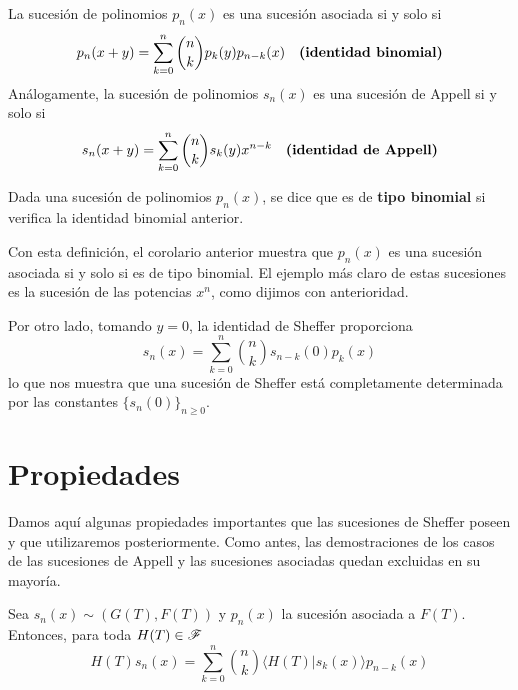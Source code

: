 \begin{corolario}\label{identidad binomial y de Appell}
    La sucesión de polinomios $p_n(x)$ es una sucesión asociada si y solo si
    \begin{equation*}
        p_n (x+y) = \sum_{k=0}^n \binom{n}{k} p_k (y) p_{n-k}(x) \quad \textnormal{\textbf{(identidad binomial)}}
    \end{equation*}
    Análogamente, la sucesión de polinomios $s_n(x)$ es una sucesión de Appell si y solo si
    \begin{equation*}
        s_n (x+y) = \sum_{k=0}^n \binom{n}{k} s_k (y)x^{n-k} \quad \textnormal{\textbf{(identidad de Appell)}}
    \end{equation*}
\end{corolario}

\begin{definicion}
    Dada una sucesión de polinomios $p_n(x)$, se dice que es de \textbf{tipo binomial} si verifica la identidad binomial anterior.
\end{definicion}

\begin{obs}
    Con esta definición, el corolario anterior muestra que $p_n(x)$ es una sucesión asociada si y solo si es de tipo binomial. El ejemplo más claro de estas sucesiones es la sucesión de las potencias $x^n$, como dijimos con anterioridad.
    
    Por otro lado, tomando $y=0$, la identidad de Sheffer proporciona
    \begin{equation*}
        s_n(x) = \sum_{k=0}^n \binom{n}{k} s_{n-k} (0)p_k(x)
    \end{equation*}
    lo que nos muestra que una sucesión de Sheffer está completamente determinada por las constantes $\{s_n(0)\}_{n \geq 0}$.
\end{obs}

\section{Propiedades}
Damos aquí algunas propiedades importantes que las sucesiones de Sheffer poseen y que utilizaremos posteriormente. Como antes, las demostraciones de los casos de las sucesiones de Appell y las sucesiones asociadas quedan excluidas en su mayoría.

\begin{teorema}
    Sea $s_n(x) \sim (G(T), F(T))$ y $p_n(x)$ la sucesión asociada a $F(T)$. Entonces, para toda $H(T) \in \mathscr{F}$
    \begin{equation*}
        H(T)s_n(x) = \sum_{k=0}^n \binom{n}{k} \langle H(T) | s_k(x) \rangle p_{n-k}(x)
    \end{equation*}
\end{teorema}


